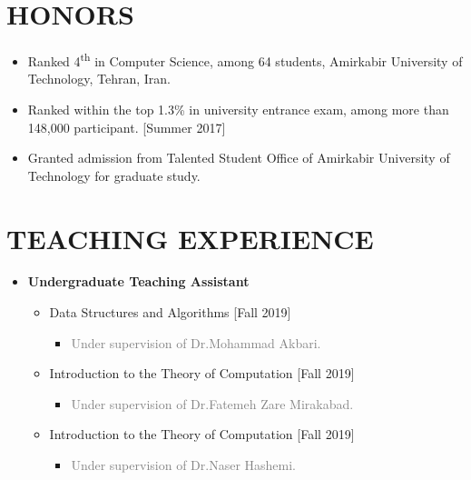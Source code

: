 \documentclass[10pt,a4paper,sans]{moderncv} %
\begin{document}
	\section{HONORS}
	
	\begin{itemize}
		\item Ranked 4\textsuperscript{th} in Computer Science, among 64 students,
		Amirkabir University of Technology, Tehran, Iran.
		
		\item Ranked within the top 1.3\% in university entrance exam, among more than 148,000
		participant. [Summer 2017]
		
				
		\item Granted admission from Talented Student Office of Amirkabir University of Technology for graduate study.
	\end{itemize}
	

	\section{TEACHING EXPERIENCE}
	\begin{itemize}
		\item { \textbf{Undergraduate Teaching Assistant}}
			\begin{itemize}
			\vspace{0.25em}
			\item Data Structures and Algorithms
			\hfill[Fall 2019]
			\begin{itemize}
				\item \textcolor{gray}{Under supervision of Dr.Mohammad Akbari.}
			\end{itemize}
			
			\vspace{0.25em}
			\item Introduction to the Theory of Computation
			\hfill[Fall 2019]
			\begin{itemize}
				\item \textcolor{gray}{Under supervision of Dr.Fatemeh Zare Mirakabad.}
			\end{itemize}
			\vspace{0.25em}
			\item Introduction to the Theory of Computation
			\hfill[Fall 2019]
			\begin{itemize}
				\item \textcolor{gray}{Under supervision of Dr.Naser Hashemi.}
			\end{itemize}
				
			\end{itemize}
	\end{itemize}
\end{document}
